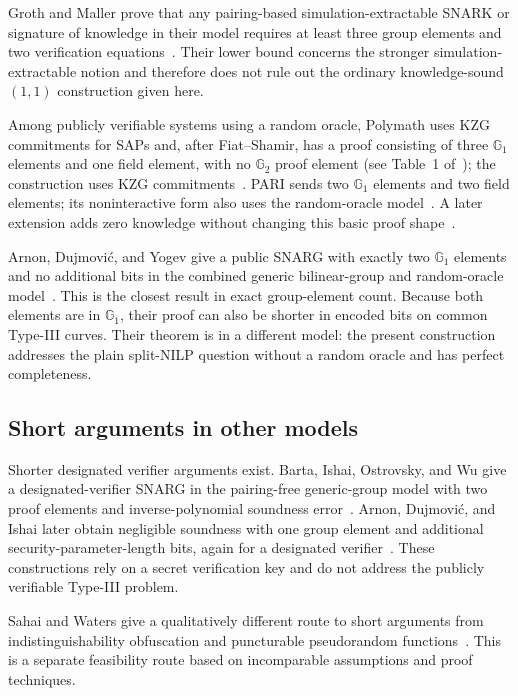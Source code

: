 \documentclass[11pt]{article}
\theoremstyle{definition}
\newcommand{\Gone}{\mathbb G_1}
\newcommand{\Gtwo}{\mathbb G_2}
\begin{document}
Groth and Maller prove that any pairing-based simulation-extractable SNARK or
signature of knowledge in their model requires at least three group elements
and two verification equations~\cite{GM17}.  Their lower bound concerns the
stronger simulation-extractable notion and therefore does not rule out the
ordinary knowledge-sound $(1,1)$ construction given here.

Among publicly verifiable systems using a random oracle, Polymath uses KZG
commitments for SAPs and, after Fiat--Shamir, has a proof consisting of three
$\Gone$ elements and one field element, with no $\Gtwo$ proof
element (see Table~1 of~\cite{Lipmaa24}); the construction uses KZG
commitments~\cite{KZG10}.  PARI sends two $\Gone$ elements and two field
elements; its noninteractive form also uses the random-oracle
model~\cite{DMS26}.  A later extension adds zero knowledge without changing
this basic proof shape~\cite{zkPARI26}.

Arnon, Dujmovi\'c, and Yogev give a public SNARG with exactly two $\Gone$
elements and no additional bits in the combined generic bilinear-group and
random-oracle model~\cite{ADY26}.  This is the closest result in exact
group-element count.  Because both elements are in $\Gone$, their proof can
also be shorter in encoded bits on common Type-III curves.  Their theorem is
in a different model: the present construction addresses the plain split-NILP
question without a random oracle and has perfect completeness.

\subsection{Short arguments in other models}

Shorter designated verifier arguments exist.  Barta,
Ishai, Ostrovsky, and Wu give a designated-verifier SNARG in the pairing-free
generic-group model with two proof elements and inverse-polynomial soundness
error~\cite{BIOW20}.  Arnon, Dujmovi\'c, and Ishai later obtain negligible
soundness with one group element and additional security-parameter-length
bits, again for a designated verifier~\cite{ADI25}.  These constructions rely
on a secret verification key and do not address the publicly verifiable
Type-III problem.

Sahai and Waters give a qualitatively different route to short arguments from
indistinguishability obfuscation and puncturable pseudorandom
functions~\cite{SW14}.  This is a separate feasibility route based on
incomparable assumptions and proof techniques.
\end{document}
